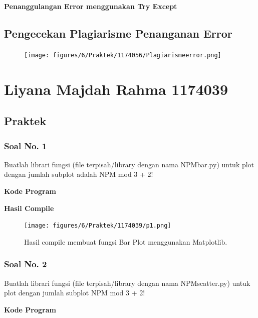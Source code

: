 \textbf{Penanggulangan Error menggunakan Try Except}


\subsection{Pengecekan Plagiarisme Penanganan Error}
\begin{figure}[H]
	\texttt{[image: figures/6/Praktek/1174056/Plagiarismeerror.png]}
	\centering
\end{figure}
\section{Liyana Majdah Rahma 1174039}
\subsection{Praktek}
\subsubsection{Soal No. 1}
\hfill \break
Buatlah librari fungsi (file terpisah/library dengan nama NPMbar.py) untuk plot dengan jumlah subplot adalah NPM mod 3 + 2!

\hfill \break
\textbf{Kode Program}



\hfill \break
\textbf{Hasil Compile}

\begin{figure}[H]
	\texttt{[image: figures/6/Praktek/1174039/p1.png]}
	\centering
	\caption{Hasil compile membuat fungsi Bar Plot menggunakan Matplotlib.}
\end{figure}

\subsubsection{Soal No. 2}
\hfill \break
Buatlah librari fungsi (file terpisah/library dengan nama NPMscatter.py) untuk plot dengan jumlah subplot NPM mod 3 + 2!

\hfill \break
\textbf{Kode Program}



